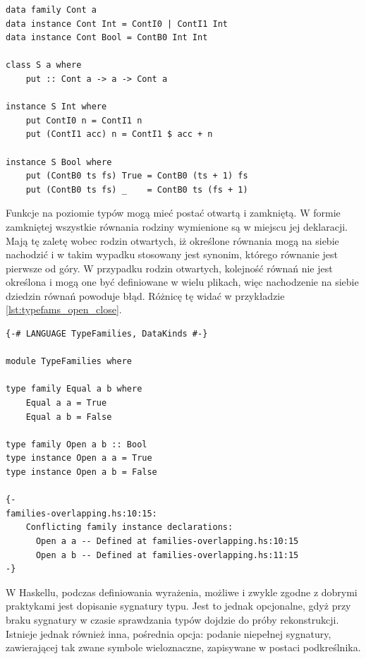 {\begin{lstlisting}[float,label={lst:typefams_assoc_standalone},
                   caption={Przykład pozwiązanej z klasą i niezależnej rodziny typów.}]
data family Cont a
data instance Cont Int = ContI0 | ContI1 Int
data instance Cont Bool = ContB0 Int Int

class S a where
    put :: Cont a -> a -> Cont a

instance S Int where
    put ContI0 n = ContI1 n
    put (ContI1 acc) n = ContI1 $ acc + n

instance S Bool where
    put (ContB0 ts fs) True = ContB0 (ts + 1) fs
    put (ContB0 ts fs) _    = ContB0 ts (fs + 1)
\end{lstlisting}

Funkcje na poziomie typów mogą mieć postać otwartą i zamkniętą. W formie
zamkniętej wszystkie równania rodziny wymienione są w miejscu jej
deklaracji. Mają tę zaletę wobec rodzin otwartych, iż określone równania mogą na
siebie nachodzić i w takim wypadku stosowany jest synonim, którego równanie jest
pierwsze od góry. W przypadku rodzin otwartych, kolejność równań nie jest
określona i mogą one być definiowane w wielu plikach, więc nachodzenie na siebie
dziedzin równań powoduje błąd. Różnicę tę widać w przykładzie
\ref{lst:typefams_open_close}\cite{GuideTypeFamilies}.

\begin{lstlisting}[float,label={lst:typefams_open_close},
                   caption={Przykład otwartej i zamkniętej funkcji na typach z nachodzącymi na siebie dziedzinami.}]
{-# LANGUAGE TypeFamilies, DataKinds #-}

module TypeFamilies where

type family Equal a b where
    Equal a a = True
    Equal a b = False

type family Open a b :: Bool
type instance Open a a = True
type instance Open a b = False

{-
families-overlapping.hs:10:15:
    Conflicting family instance declarations:
      Open a a -- Defined at families-overlapping.hs:10:15
      Open a b -- Defined at families-overlapping.hs:11:15
-}
\end{lstlisting}

\label{sec:partial_sigs}

W Haskellu, podczas definiowania wyrażenia, możliwe i zwykle zgodne z dobrymi
praktykami jest dopisanie sygnatury typu. Jest to jednak opcjonalne, gdyż przy
braku sygnatury w czasie sprawdzania typów dojdzie do próby
rekonstrukcji. Istnieje jednak również inna, pośrednia opcja: podanie niepełnej
sygnatury, zawierającej tak zwane symbole wieloznaczne, zapisywane w postaci
podkreślnika.

}
